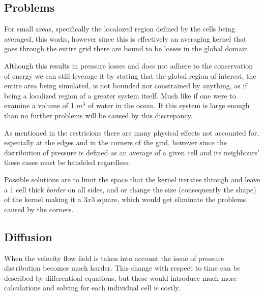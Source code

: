 \documentclass[12pt, titlepage]{article}
\begin{document}
\subsection{Problems}
For small areas, specifically the localozed region defined by the cells being averaged, this works, however since this is effectively an averaging kernel that goes through the entire grid there are bound to be losses in the global domain. 

\bigskip

Although this results in pressure losses and does not adhere to the conservation of energy we can still leverage it by stating that the global region of interest, the entire area being simulated, is not bounded nor constrained by anything, as if being a localized region of a greater system itself. Much like if one were to examine a volume of 1 $m^3$ of water in the ocean. If this system is large enough than no further problems will be caused by this discrepancy.

\bigskip

As mentioned in the restricions there are many physical effects not accounted for, especially at the edges and in the corners of the grid, however since the distribution of pressure is defined as an average of a given cell and its neighbours' these cases must be handeled regardless.

\bigskip

Possible solutions are to limit the space that the kernel iterates through and leave a 1 cell thick \textit{border} on all sides, and or change the size (consequently the shape) of the kernel making it a $3x3$ square, which would get eliminate the problems caused by the corners.

\subsection{Diffusion}

When the velocity flow field is taken into account the issue of pressure distribution becomes much harder. This change with respect to time can be described by differentioal equations, but these would introduce much more calculations and solving for each individual cell is costly.
\end{document}

